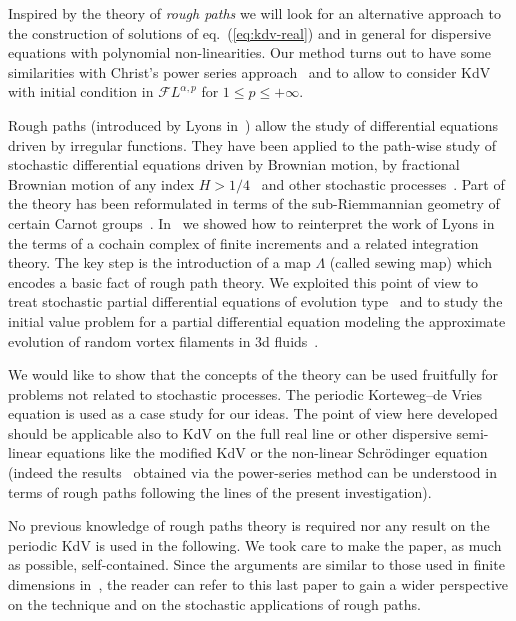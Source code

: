 \documentclass[a4paper,11pt,reqno]{article}
\newcommand{\FF}{\mathcal{F}}
\begin{document}
Inspired by the theory of \emph{rough paths} we will look for an alternative approach to the
construction of solutions of eq.~(\ref{eq:kdv-real}) and in general for dispersive equations with polynomial non-linearities. Our method turns out to have some similarities with Christ's power series approach~\cite{MR2333210, MR2411067} and to allow to consider KdV with initial condition in $\FF L^{\alpha,p}$ for $1\le p \le +\infty$.

Rough paths (introduced by Lyons in~\cite{MR1654527,MR2036784}) allow the study of differential
equations driven by irregular functions. They have been applied to the
path-wise study of stochastic differential equations driven by
Brownian motion, by fractional Brownian motion of any index $H>1/4$~\cite{MR1883719}
and other stochastic processes~\cite{MR2164030,fvsubell}. Part of the theory has been reformulated in terms of the sub-Riemmannian geometry of certain Carnot groups~\cite{fvgeo}. 
In~\cite{MR2091358} we showed how to reinterpret the work of Lyons in the terms of a
cochain complex of finite increments and a related integration
theory. The key step is the introduction of a map $\Lambda$ (called
sewing map) which encodes a basic fact of rough path theory.
We exploited this point of view 
 to treat stochastic partial differential
equations of evolution type~\cite{youngspde,TindelGubinelli} and to
study the initial value problem for a partial differential  equation
modeling the approximate evolution of random vortex filaments in 3d
fluids~\cite{evolution}. 

We would like to show that the concepts of the theory can be used
fruitfully for problems not related to stochastic processes.
The periodic Korteweg--de Vries equation is used as a case study for our
ideas. The point of view here developed should be applicable also to KdV on
the full  real line or other dispersive semi-linear equations like the
modified KdV or the non-linear Schr\"odinger equation (indeed the results~\cite{MR2333210, MR2411067} obtained via the power-series method can be understood in terms of rough paths following the lines of the present investigation).  

No previous knowledge of rough paths theory is required nor any
 result on the periodic KdV is used in the following. We took care to
make the paper, as much as possible, self-contained. Since the
arguments are similar to those used in finite dimensions
in~\cite{MR2091358},  the reader can refer to this last paper to gain a wider perspective
on the technique and on the stochastic applications of rough paths. 
\end{document}
